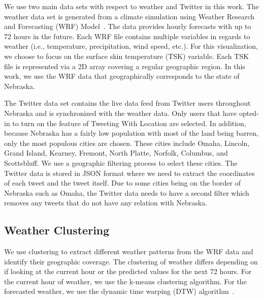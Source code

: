 We use two main data sets with respect to weather and Twitter in this work. The weather data set is generated from a climate simulation using Weather Research and Forecasting (WRF) Model~\cite{Michalakes2004}. %
The data provides hourly forecasts with up to 72 hours in the future. Each WRF file contains multiple variables in regards to weather (i.e., temperature, precipitation, wind speed, etc.). For this visualization, we choose to focus on the surface skin temperature (TSK) variable. Each TSK file is represented via a 2D array %
covering a regular geographic region. In this work, we use the WRF data that geographically corresponds to the state of Nebraska.

The Twitter data set contains the live data feed from Twitter users throughout Nebraska and is synchronized with the weather data. Only users that have opted-in to turn on the feature of Tweeting With Location are selected. In addition, because Nebraska has a fairly low population with most of the land being barren, only the most populous cities are chosen. These cities include Omaha, Lincoln, Grand Island, Kearney, Fremont, North Platte, Norfolk, Columbus, and Scottsbluff. We use a geographic filtering process to select these cities. The Twitter data is stored in JSON format where we need to extract the coordinates of each tweet and the tweet itself. Due to some cities being on the border of Nebraska such as Omaha, the Twitter data needs to have a second filter which removes any tweets that do not have any relation with Nebraska.


\subsection{Weather Clustering}
\label{sec:clust}

We use clustering to extract different weather patterns from the WRF data and identify their geographic coverage. The clustering of weather differs depending on if looking at the current hour or the predicted values for the next 72 hours. For the current hour of weather, we use the k-means clustering algorithm. %
For the forecasted weather, we use the dynamic time warping (DTW) algorithm~\cite{salvador2007toward}.


